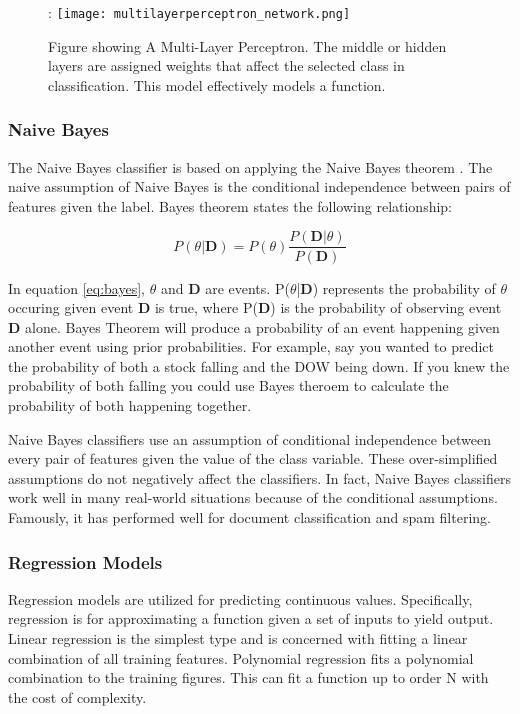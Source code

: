\begin{figure}[htp]:
    \centering
    \texttt{[image: multilayerperceptron\_network.png]}
    \caption{Figure showing A Multi-Layer Perceptron. The middle or hidden layers are assigned weights that affect the selected class in classification.
    This model effectively models a function.}
    \label{}
\end{figure}



\subsubsection{Naive Bayes}
The Naive Bayes classifier is based on applying the Naive Bayes theorem \cite{zhang2004optimality}.
The naive assumption of Naive Bayes is the conditional independence between pairs of features given the label.
Bayes theorem states the following relationship:

\begin{equation}
    \label{eq:bayes}
    P(\theta|\textbf{D}) = P(\theta) \frac{P(\textbf{D} |\theta)}{P(\textbf{D})}
\end{equation}

In equation \ref{eq:bayes}, $\theta$ and \textbf{D} are events. 
P($\theta$|\textbf{D}) represents the probability of $\theta$ occuring given event \textbf{D} is true, where P(\textbf{D}) is the probability of observing event \textbf{D} alone.
Bayes Theorem will produce a probability of an event happening given another event using prior probabilities.
For example, say you wanted to predict the probability of both a stock falling and the DOW being down.
If you knew the probability of both falling you could use Bayes theroem to calculate the probability of both happening together.

Naive Bayes classifiers use an assumption of conditional independence between every pair of features given the value of the class variable. 
These over-simplified assumptions do not negatively affect the classifiers.
In fact, Naive Bayes classifiers work well in many real-world situations because of the conditional assumptions\cite{zhang2004optimality}.
Famously, it has performed well for document classification and spam filtering. 

\subsubsection{Regression Models}
Regression models are utilized for predicting continuous values.
Specifically, regression is for approximating a function given a set of inputs to yield output.
Linear regression is the simplest type and is concerned with fitting a linear combination of all training features.
Polynomial regression fits a polynomial combination to the training figures.
This can fit a function up to order N with the cost of complexity.

